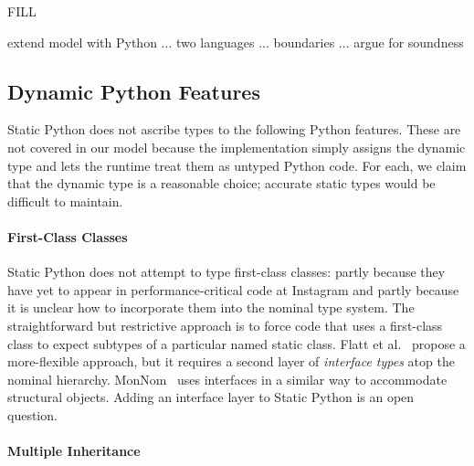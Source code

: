 \documentclass[english,cleveref,submission]{programming}
\newcommand{\SP}{Static Python}
\begin{document}
FILL

extend model with Python ... two languages ... boundaries ... argue for soundness


\subsection{Dynamic Python Features}
\label{s:dynamic-python}

\SP{} does not ascribe types to the following Python features.
These are not covered in our model because the implementation simply
assigns the dynamic type and lets the runtime treat them as untyped
Python code.
For each, we claim that the dynamic type is a reasonable choice;
accurate static types would be difficult to maintain.


\paragraph{First-Class Classes}

\SP{} does not attempt to type first-class classes: partly because they have
yet to appear in performance-critical code at Instagram and partly because it
is unclear how to incorporate them into the nominal type system.
The straightforward but restrictive approach is to force code that uses a
first-class class to expect subtypes of a particular named static class.
Flatt et al.~\cite{fkf-popl-1998} propose a more-flexible approach, %
but it requires a second layer of \emph{interface types} atop the nominal hierarchy.
MonNom~\cite{mt-oopsla-2021} uses interfaces in a similar way to accommodate
structural objects.
Adding an interface layer to \SP{} is an open question.




\paragraph{Multiple Inheritance}
\end{document}
